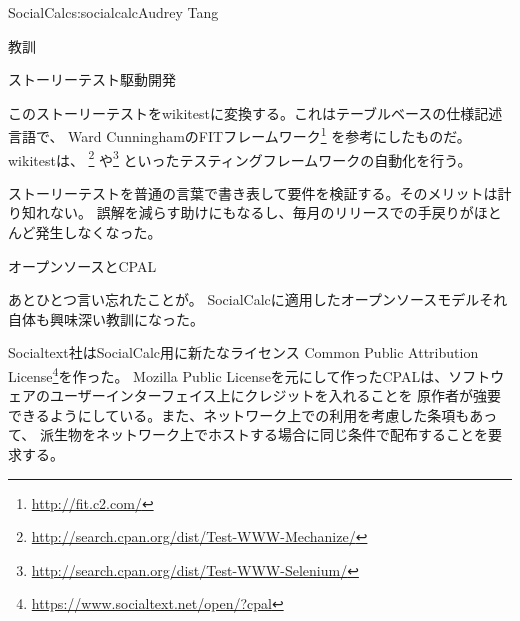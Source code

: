 \begin{aosachapter}{SocialCalc}{s:socialcalc}{Audrey Tang}
\begin{aosasect1}{教訓}
\begin{aosasect2}{ストーリーテスト駆動開発}
\begin{quotation}
\end{quotation}

このストーリーテストをwikitestに変換する。これはテーブルベースの仕様記述言語で、
Ward CunninghamのFITフレームワーク\footnote{\url{http://fit.c2.com/}}
を参考にしたものだ。wikitestは、
\footnote{\url{http://search.cpan.org/dist/Test-WWW-Mechanize/}}
や\footnote{\url{http://search.cpan.org/dist/Test-WWW-Selenium/}}
といったテスティングフレームワークの自動化を行う。

ストーリーテストを普通の言葉で書き表して要件を検証する。そのメリットは計り知れない。
誤解を減らす助けにもなるし、毎月のリリースでの手戻りがほとんど発生しなくなった。

\end{aosasect2}


\begin{aosasect2}{オープンソースとCPAL}

あとひとつ言い忘れたことが。
SocialCalcに適用したオープンソースモデルそれ自体も興味深い教訓になった。


Socialtext社はSocialCalc用に新たなライセンス
Common Public Attribution License\footnote{\url{https://www.socialtext.net/open/?cpal}}を作った。
Mozilla Public Licenseを元にして作ったCPALは、ソフトウェアのユーザーインターフェイス上にクレジットを入れることを
原作者が強要できるようにしている。また、ネットワーク上での利用を考慮した条項もあって、
派生物をネットワーク上でホストする場合に同じ条件で配布することを要求する。


\end{aosasect2}
\end{aosasect1}
\end{aosachapter}
